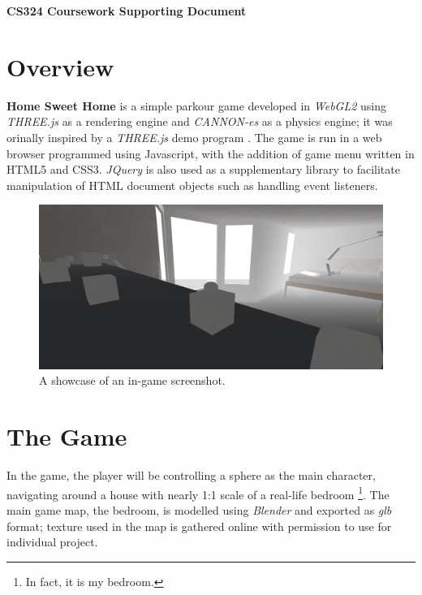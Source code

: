 \documentclass[12pt, a4paper, oneside]{article}
\begin{document}
    \LARGE
    \begin{center}
        \textbf{CS324 Coursework Supporting Document}
    \end{center}

    \normalsize
    \flushleft

    \section{Overview}

    \textbf{Home Sweet Home} is a simple parkour game developed in \textit{WebGL2} using \textit{THREE.js} \cite{three} as a rendering engine and \textit{CANNON-es} \cite{cannon-es} as a physics engine; it was orinally inspired by a \textit{THREE.js} demo program \cite{original_inspiration}. The game is run in a web browser programmed using Javascript, with the addition of game menu written in HTML5 and CSS3. \textit{JQuery} \cite{jquery} is also used as a supplementary library to facilitate manipulation of HTML document objects such as handling event listeners.

    \begin{figure}[H]
        \includegraphics[width=\textwidth]{showcase.png}
        \caption{A showcase of an in-game screenshot.}
    \end{figure}

    \section{The Game}

    In the game, the player will be controlling a sphere as the main character, navigating around a house with nearly 1:1 scale of a real-life bedroom \footnote{In fact, it is my bedroom.}. The main game map, the bedroom, is modelled using \textit{Blender} and exported as \textit{glb} format; texture used in the map is gathered online \cite{texture_res} with permission to use for individual project.
\end{document}
